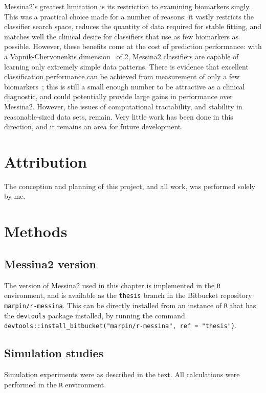 \documentclass[dissertation.tex]{subfiles}
\begin{document}
Messina2's greatest limitation is its restriction to examining biomarkers singly.  This was a practical choice made for a number of reasons: it vastly restricts the classifier search space, reduces the quantity of data required for stable fitting, and matches well the clinical desire for classifiers that use as few biomarkers as possible.  However, these benefits come at the cost of prediction performance: with a Vapnik-Chervonenkis dimension~\cite{Vapnik2000} of 2, Messina2 classifiers are capable of learning only extremely simple data patterns.  There is evidence that excellent classification performance can be achieved from measurement of only a few biomarkers~\cite{Grate2005}; this is still a small enough number to be attractive as a clinical diagnostic, and could potentially provide large gains in performance over Messina2.  However, the issues of computational tractability, and stability in reasonable-sized data sets, remain.  Very little work has been done in this direction, and it remains an area for future development.


\section{Attribution}
The conception and planning of this project, and all work, was performed solely by me.

\section{Methods}

\subsection{Messina2 version}
The version of Messina2 used in this chapter is implemented in the \texttt{R} environment, and is available as the \texttt{thesis} branch in the Bitbucket repository \texttt{marpin/r-messina}.  This can be directly installed from an instance of \texttt{R} that has the \texttt{devtools} package installed, by running the command \texttt{devtools::install\_bitbucket("marpin/r-messina", ref = "thesis")}.

\subsection{Simulation studies}
Simulation experiments were as described in the text.  All calculations were performed in the \texttt{R} environment.
\end{document}
